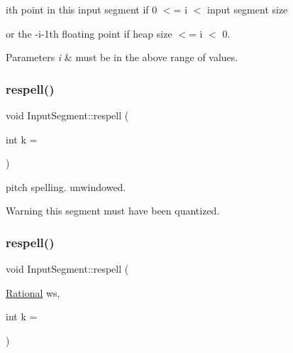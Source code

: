 \begin{DoxyItemize}
\item ith point in this input segment if 0 $<$= i $<$ input segment size
\item or the -\/i-\/1th floating point if heap size $<$= i $<$ 0. 
\begin{DoxyParams}{Parameters}
{\em i} & must be in the above range of values. \\
\hline
\end{DoxyParams}

\end{DoxyItemize}\mbox{\label{group__segment_ga2d78677ab3ea44ae91034c4e312e778c}} 
\subsubsection{\texorpdfstring{respell()}{respell()}\hspace{0.1cm}{\footnotesize\ttfamily [1/2]}}
{\footnotesize\ttfamily void Input\+Segment\+::respell (\begin{DoxyParamCaption}\item[{int}]{k = {} }\end{DoxyParamCaption})}



pitch spelling. unwindowed. 

\begin{DoxyWarning}{Warning}
this segment must have been quantized. 
\end{DoxyWarning}
\mbox{\label{group__segment_gac79787254008e05d9f54226d93dcb0cb}} 
\subsubsection{\texorpdfstring{respell()}{respell()}\hspace{0.1cm}{\footnotesize\ttfamily [2/2]}}
{\footnotesize\ttfamily void Input\+Segment\+::respell (\begin{DoxyParamCaption}\item[{\mbox{\hyperlink{classRational}{Rational}}}]{ws,  }\item[{int}]{k = {} }\end{DoxyParamCaption})}



